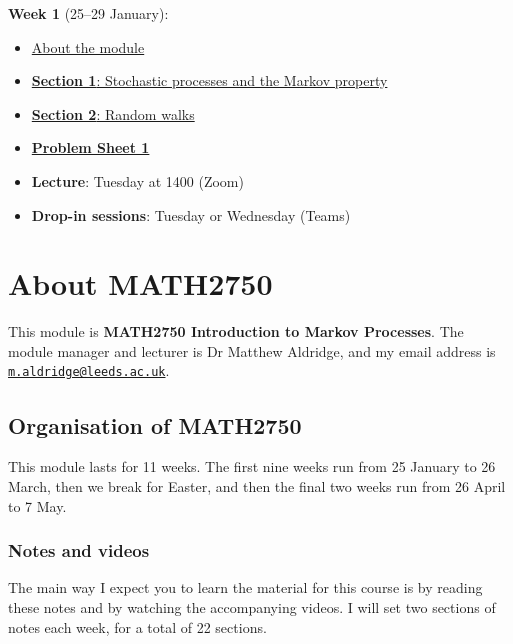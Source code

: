 \documentclass[
  a4paper,
]{article}
\providecommand{\tightlist}{%
  \setlength{\itemsep}{0pt}\setlength{\parskip}{0pt}}
\theoremstyle{definition}
\theoremstyle{definition}
\theoremstyle{definition}
\theoremstyle{remark}
\begin{document}
\textbf{Week 1} (25--29 January):

\begin{itemize}
\tightlist
\item
  \protect\hyperlink{S00-about}{About the module}
\item
  \protect\hyperlink{S01-stochastic-processes}{\textbf{Section 1}: Stochastic processes and the Markov property}
\item
  \protect\hyperlink{S02-random-walk}{\textbf{Section 2}: Random walks}
\item
  \protect\hyperlink{P01}{\textbf{Problem Sheet 1}}
\item
  \textbf{Lecture}: Tuesday at 1400 (Zoom)
\item
  \textbf{Drop-in sessions}: Tuesday or Wednesday (Teams)
\end{itemize}

\hypertarget{S00-about}{%
\section*{About MATH2750}\label{S00-about}}

This module is \textbf{MATH2750 Introduction to Markov Processes}. The module manager and lecturer is Dr Matthew Aldridge, and my email address is \href{mailto:m.aldridge@leeds.ac.uk}{\nolinkurl{m.aldridge@leeds.ac.uk}}.

\hypertarget{about-module}{%
\subsection*{Organisation of MATH2750}\label{about-module}}

This module lasts for 11 weeks. The first nine weeks run from 25 January to 26 March, then we break for Easter, and then the final two weeks run from 26 April to 7 May.

\hypertarget{notes}{%
\subsubsection*{Notes and videos}\label{notes}}

The main way I expect you to learn the material for this course is by reading these notes and by watching the accompanying videos. I will set two sections of notes each week, for a total of 22 sections.
\end{document}
